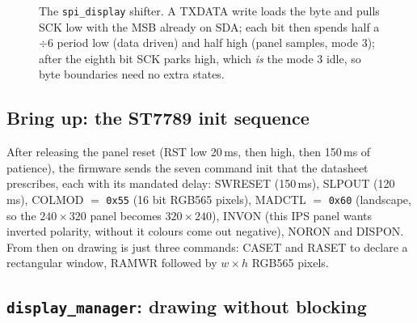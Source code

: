 \documentclass[a4paper,11pt]{article}
\begin{document}
\begin{figure}[H]
\centering
{}
\caption{The \texttt{spi\_display} shifter. A TXDATA write loads the byte and
pulls SCK low with the MSB already on SDA; each bit then spends half a $\div6$
period low (data driven) and half high (panel samples, mode 3); after the
eighth bit SCK parks high, which \emph{is} the mode 3 idle, so byte boundaries
need no extra states.}
\label{fig:disp-fsm}
\end{figure}

\subsection{Bring up: the ST7789 init sequence}

After releasing the panel reset (RST low 20\,ms, then high, then 150\,ms of
patience), the firmware sends the seven command init that the datasheet
prescribes, each with its mandated delay: SWRESET (150\,ms), SLPOUT (120\,ms),
COLMOD $=$ \texttt{0x55} (16 bit RGB565 pixels), MADCTL $=$ \texttt{0x60}
(landscape, so the $240\times320$ panel becomes $320\times240$), INVON (this
IPS panel wants inverted polarity, without it colours come out negative), NORON
and DISPON. From then on drawing is just three commands: CASET and RASET to
declare a rectangular window, RAMWR followed by $w\times h$ RGB565 pixels.

\subsection{\texttt{display\_manager}: drawing without blocking}
\end{document}
